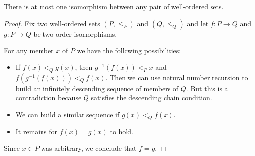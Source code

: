 \begin{proposition}\label{thm:well_ordered_isomorphism_is_unique}
  There is at most one isomorphism between any pair of well-ordered sets.
\end{proposition}
\begin{proof}
  Fix two well-ordered sets \( (P, \leq_P) \) and \( (Q, \leq_Q) \) and let \( f: P \to Q \) and \( g: P \to Q \) be two order isomorphisms.

  For any member \( x \) of \( P \) we have the following possibilities:
  \begin{itemize}
    \item If \( f(x) <_Q g(x) \), then \( g^{-1}(f(x)) <_P x \) and \( f(g^{-1}(f(x))) <_Q f(x) \). Then we can use \hyperref[rem:natural_number_recursion]{natural number recursion} to build an infinitely descending sequence of members of \( Q \). But this is a contradiction because \( Q \) satisfies the descending chain condition.

    \item We can build a similar sequence if \( g(x) <_Q f(x) \).

    \item It remains for \( f(x) = g(x) \) to hold.
  \end{itemize}

  Since \( x \in P \) was arbitrary, we conclude that \( f = g \).
\end{proof}

